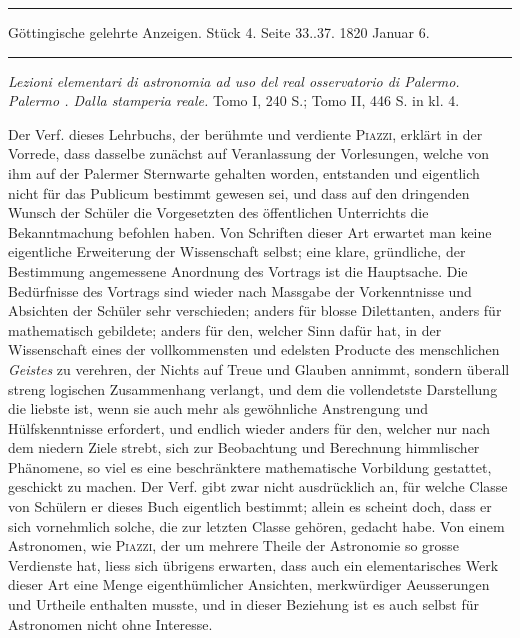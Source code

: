 \par\bigskip
\hypertarget{native-622-lower}{}
\begin{center}
\parbox{.92\linewidth}{\centering\small
\rule{\linewidth}{.3pt}\par\smallskip
Göttingische gelehrte Anzeigen. Stück 4. Seite 33..37. 1820 Januar 6.\par\smallskip
\rule{\linewidth}{.3pt}}
\end{center}
\par\medskip

\noindent\emph{Lezioni elementari di astronomia ad uso del real osservatorio di Palermo. Palermo {}. Dalla stamperia reale.} Tomo I, 240 S.; Tomo II, 446 S. in kl. 4.

Der Verf. dieses Lehrbuchs, der berühmte und verdiente \textsc{Piazzi}, erklärt in der Vorrede, dass dasselbe zunächst auf Veranlassung der Vorlesungen, welche von ihm auf der Palermer Sternwarte gehalten worden, entstanden und eigentlich nicht für das Publicum bestimmt gewesen sei, und dass auf den dringenden Wunsch der Schüler die Vorgesetzten des öffentlichen Unterrichts die Bekanntmachung befohlen haben. Von Schriften dieser Art erwartet man keine eigentliche Erweiterung der Wissenschaft selbst; eine klare, gründliche, der Bestimmung angemessene Anordnung des Vortrags ist die Hauptsache. Die Bedürfnisse des Vortrags sind wieder nach Massgabe der Vorkenntnisse und Absichten der Schüler sehr verschieden; anders für blosse Dilettanten, anders für mathematisch gebildete; anders für den, welcher Sinn dafür hat, in der Wissenschaft eines der vollkommensten und edelsten Producte des menschlichen \emph{Geistes} zu verehren, der Nichts auf Treue und Glauben annimmt, sondern überall streng logischen Zusammenhang verlangt, und dem die vollendetste Darstellung die liebste ist, wenn sie auch mehr als gewöhnliche Anstrengung und Hülfskenntnisse erfordert, und endlich wieder anders für den, welcher nur nach dem niedern Ziele strebt, sich zur Beobachtung und Berechnung himmlischer Phänomene, so viel es eine beschränktere mathematische Vorbildung gestattet, geschickt zu machen. Der Verf. gibt zwar nicht ausdrücklich an, für welche Classe von Schülern er dieses Buch eigentlich bestimmt; allein es scheint doch, dass er sich vornehmlich solche, die zur letzten Classe gehören, gedacht habe. Von einem Astronomen, wie \textsc{Piazzi}, der um mehrere Theile der Astronomie so grosse Verdienste hat, liess sich übrigens erwarten, dass auch ein elementarisches Werk dieser Art eine Menge eigenthümlicher Ansichten, merkwürdiger Aeusserungen und Urtheile enthalten musste, und in dieser Beziehung ist es auch selbst für Astronomen nicht ohne Interesse.

